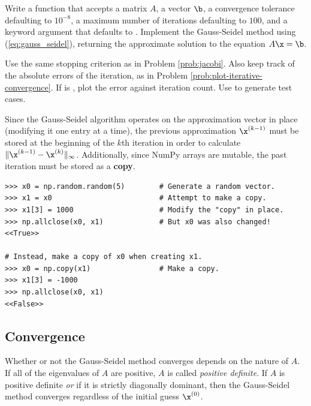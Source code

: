 \begin{problem} %
Write a function that accepts a matrix $A$, a vector $\b$, a convergence tolerance  defaulting to $10^{-8}$, a maximum number of iterations  defaulting to $100$, and a keyword argument  that defaults to .
Implement the Gauss-Seidel method using (\ref{eq:gauss_seidel}), returning the approximate solution to the equation $A\x = \b$.

Use the same stopping criterion as in Problem \ref{prob:jacobi}.
Also keep track of the absolute errors of the iteration, as in Problem \ref{prob:plot-iterative-convergence}.
If  is , plot the error against iteration count.
Use  to generate test cases.

\begin{warn} %
Since the Gauss-Seidel algorithm operates on the approximation vector in place (modifying it one entry at a time), the previous approximation $\x^{(k-1)}$ must be stored at the beginning of the $k$th iteration in order to calculate $\|\x^{(k-1)} - \x^{(k)}\|_\infty$.
Additionally, since NumPy arrays are mutable, the past iteration must be stored as a \textbf{copy}.

\begin{lstlisting}
>>> x0 = np.random.random(5)        # Generate a random vector.
>>> x1 = x0                         # Attempt to make a copy.
>>> x1[3] = 1000                    # Modify the "copy" in place.
>>> np.allclose(x0, x1)             # But x0 was also changed!
<<True>>

# Instead, make a copy of x0 when creating x1.
>>> x0 = np.copy(x1)                # Make a copy.
>>> x1[3] = -1000
>>> np.allclose(x0, x1)
<<False>>
\end{lstlisting}
\end{warn}

\label{prob:gauss_seidel}
\end{problem}

\subsection*{Convergence} %

Whether or not the Gauss-Seidel method converges depends on the nature of $A$.
If all of the eigenvalues of $A$ are positive, $A$ is called \emph{positive definite}.
If $A$ is positive definite \emph{or} if it is strictly diagonally dominant, then the Gauss-Seidel method converges regardless of the initial guess $\x^{(0)}$.


